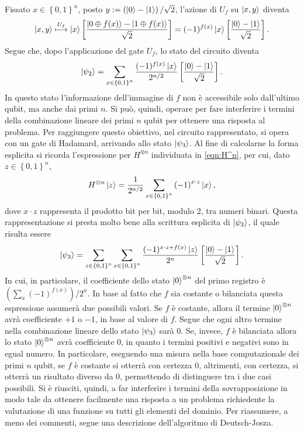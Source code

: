 Fissato $x \in \left\{0,1\right\}^n$, posto $y := \left(\ket{0} - \ket{1}\right)/\sqrt{2}$, l'azione di $U_f$ su $\ket{x,y}$ diventa
\begin{equation}
 \ket{x,y} \stackrel{U_f}{\longmapsto} \ket{x} \left[ \frac{\ket{0 \oplus f(x)} - \ket{1 \oplus f(x)}}{\sqrt{2}} \right] = (-1)^{f(x)}\ket{x} \left[ \frac{\ket{0} - \ket{1}}{\sqrt{2}} \right].
\end{equation}
Segue che, dopo l'applicazione del gate $U_f$, lo stato del circuito diventa
\begin{equation}
 \ket{\psi_2} = \sum_{x \in \left\{0,1\right\}^n} \frac{(-1)^{f(x)}\ket{x}}{2^{n/2}} \left[\frac{\ket{0} - \ket{1}}{\sqrt{2}} \right].
\end{equation}
In questo stato l'informazione dell'immagine di $f$ non è accessibile solo dall'ultimo qubit, ma anche dai primi $n$. 
Si può, quindi, operare per fare interferire i termini della combinazione lineare dei primi $n$ qubit per ottenere una risposta al problema. 
Per raggiungere questo obiettivo, nel circuito rappresentato, si opera con un gate di Hadamard, arrivando allo stato $\ket{\psi_3}$.
Al fine di  calcolarne la forma esplicita si ricorda l'espressione per $H^{\otimes n}$ individuata in \eqref{eqn:H^n}, per cui, dato $z \in \left\{0,1\right\}^n$,
\begin{equation}
 H^{\otimes n}\ket{z} = \frac{1}{2^{n/2}}\sum_{x \in \left\{0,1\right\}^n} \left(-1 \right)^{x\cdot z}\ket{x},
\end{equation}
dove $x \cdot z$ rappresenta il prodotto bit per bit, modulo 2, tra numeri binari.
Questa rappresentazione si presta molto bene alla scrittura esplicita di $\ket{\psi_3}$, il quale risulta essere
\begin{equation}
 \ket{\psi_3} = \sum_{z \in \left\{0,1\right\}^n} \sum_{x \in \left\{0,1\right\}^n} \frac{(-1)^{x\cdot z + f(x)}\ket{z}}{2^n} \left[\frac{\ket{0} - \ket{1}}{\sqrt{2}} \right].
\end{equation}
In cui, in particolare, il coefficiente dello stato $\ket{0}^{\otimes n}$ del primo registro è $\left(\sum_x (-1)^{f(x)} \right)/2^n$. 
In base al fatto che $f$ sia costante o bilanciata questa espressione assumerà due possibili valori. 
Se $f$ è costante, allora il termine $\ket{0}^{\otimes n}$ avrà coefficiente $+1$ o $-1$, in base al valore di $f$. 
Segue che ogni altro termine nella combinazione lineare dello stato $\ket{\psi_3}$ sarà 0.
Se, invece, $f$ è bilanciata allora lo stato $\ket{0}^{\otimes n}$ avrà coefficiente 0, in quanto i termini positivi e negativi sono in egual numero.
In particolare, eseguendo una misura nella base computazionale dei primi $n$ qubit, se $f$ è costante si otterrà con certezza 0, altrimenti, con certezza, si otterrà un risultato diverso da 0, permettendo di distinguere tra i due casi possibili.
Si è riusciti, quindi, a far interferire i termini della sovrapposizione in modo tale da ottenere facilmente una risposta a un problema richiedente la valutazione di una funzione su tutti gli elementi del dominio.
Per riassumere, a meno dei commenti, segue una descrizione dell'algoritmo di Deutsch-Josza.

